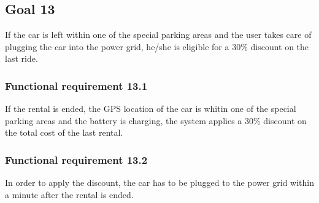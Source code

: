\subsection{Goal 13}
If the car is left within one of the special parking areas and the user takes care of plugging the car into the power grid, he/she is eligible for a 30\% discount on the last ride.

\setcounter{secnumdepth}{3}
\subsubsection{Functional requirement 13.1}
If the rental is ended, the GPS location of the car is whitin one of the special parking areas and the battery is charging, the system applies a 30\% discount on the total cost of the last rental.

\subsubsection{Functional requirement 13.2}
In order to apply the discount, the car has to be plugged to the power grid within a minute after the rental is ended.
